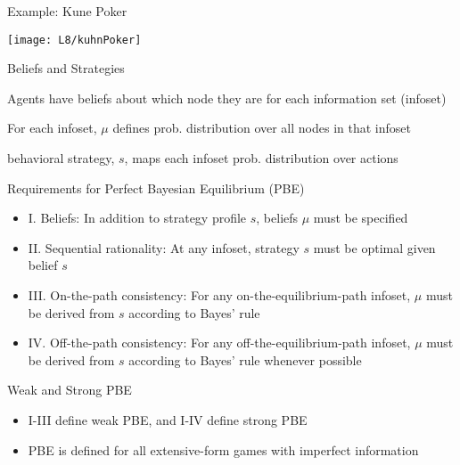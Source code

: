 \documentclass[11pt,aspectratio=169,handout]{beamer}
\begin{document}
  
  \begin{frame}{Example: Kune Poker}
   \begin{center}
    \texttt{[image: L8/kuhnPoker]}
   \end{center}
  \end{frame}
    
  
  \begin{frame}{Beliefs and Strategies}
   \begin{itemizes}[1.5em]
    \item Agents have \alert{beliefs} about which node they are for each information set (\alert{infoset})
    \item For each infoset, $\mu$ defines \alert{prob. distribution} over all nodes in that infoset
    \item \alert{behavioral strategy}, $s$, maps each infoset prob. distribution over actions
   \end{itemizes}
  \end{frame}
  
  
  \begin{frame}{Requirements for Perfect Bayesian Equilibrium (PBE)}
   \begin{itemize}[<+->]
   \setlength{\itemsep}{1em}
    \item I. Beliefs: In addition to strategy profile $s$, beliefs $\mu$ must be specified
    \item II. \alert{Sequential rationality}: At any infoset, strategy $s$ must be optimal given belief $s$
    \item III. \alert{On-the-path consistency}: For any on-the-equilibrium-path infoset, $\mu$ must be derived from $s$ according to \alert{Bayes' rule}
    \item IV. \alert{Off-the-path consistency}: For any off-the-equilibrium-path infoset, $\mu$ must be derived from $s$ according to Bayes' rule \alert{whenever possible}
   \end{itemize}     
  \end{frame}

  
  \begin{frame}{Weak and Strong PBE}
   \begin{itemize}
   \setlength{\itemsep}{2em}
    \item I-III define \alert{weak PBE}, and I-IV define {strong PBE}
    \item PBE is defined for all extensive-form games with imperfect information
   \end{itemize}
  \end{frame}
  
\end{document}
